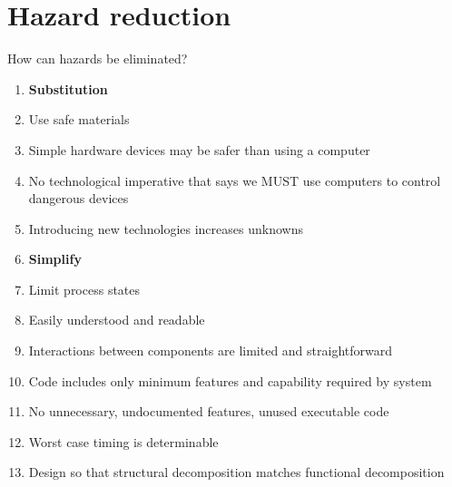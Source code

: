 \documentclass[aspectratio=1610,pdftex,dvipsnames,compress,xcolor={dvipsnames}]{beamer}
\begin{document}
\section{Hazard reduction}


\addtocounter{framenumber}{-1}
\begin{frame}{How can hazards be eliminated?}
    \begin{enumerate}[series=outerlist,topsep=0pt,itemsep=1pt,leftmargin=*,label=(\arabic*)]
        \item[]\textbf{Substitution}
        \item[]Use safe materials  
        \item[]Simple hardware devices may be safer than using a computer
        \item[]No technological imperative that says we MUST use computers to control dangerous devices  
        \item[]Introducing new technologies increases unknowns
            \vspace{0.05in}
        \item[]\textbf{Simplify}
        \item[]Limit process states  
        \item[]Easily understood and readable  
        \item[]Interactions between components are limited and straightforward  
        \item[]Code includes only minimum features and capability required by system  
        \item[]No unnecessary, undocumented features, unused executable code  
        \item[]Worst case timing is determinable  
        \item[]Design so that structural decomposition matches functional decomposition
    \end{enumerate}
\end{frame}
\end{document}
